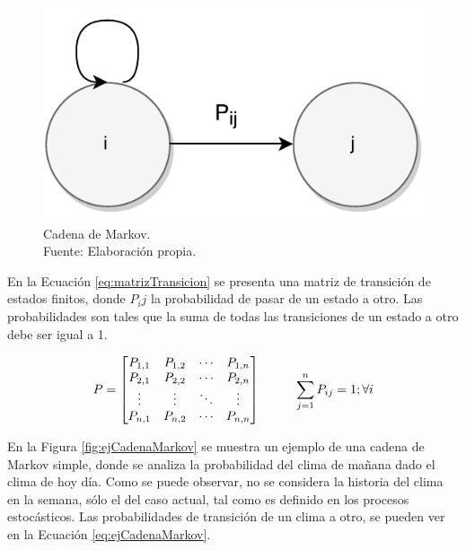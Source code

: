 \begin{figure}[ht!]
  \centering
    \includegraphics[scale=0.6]{images/CadenaMarkov.pdf}
  \caption[Cadena de Markov.]{Cadena de Markov.\\Fuente: Elaboración propia.}
  \label{fig:cadenaMarkov}
\end{figure}

En la Ecuaci\'on \ref{eq:matrizTransicion} se presenta una matriz de transici\'on de estados finitos, \normalsize{donde} $P_ij$ \normalsize{la probabilidad de pasar de un estado a otro. Las probabilidades son tales que la suma de todas las transiciones de un estado a otro debe ser igual a 1.}

\begin{equation} \label{eq:matrizTransicion}
	P =
	\begin{bmatrix}
		P_{1,1} & P_{1,2} & \cdots & P_{1,n} \\
		P_{2,1} & P_{2,2} & \cdots & P_{2,n} \\
		\vdots  & \vdots  & \ddots & \vdots  \\
		P_{n,1} & P_{n,2} & \cdots & P_{n,n} \\
	\end{bmatrix}
	\hspace*{1cm} \sum_{j=1}^{n} P_{ij} = 1 ; \forall i
\end{equation}

En la Figura \ref{fig:ejCadenaMarkov} se muestra un ejemplo de una cadena de Markov simple, donde se analiza la probabilidad del clima de ma\~nana dado el clima de hoy d\'ia. Como se puede observar, no se considera la historia del clima en la semana, s\'olo el del caso actual, tal como es definido en los procesos estoc\'asticos. Las probabilidades \normalsize{de transici\'on} de un clima a otro, se pueden ver en la Ecuaci\'on \ref{eq:ejCadenaMarkov}.

